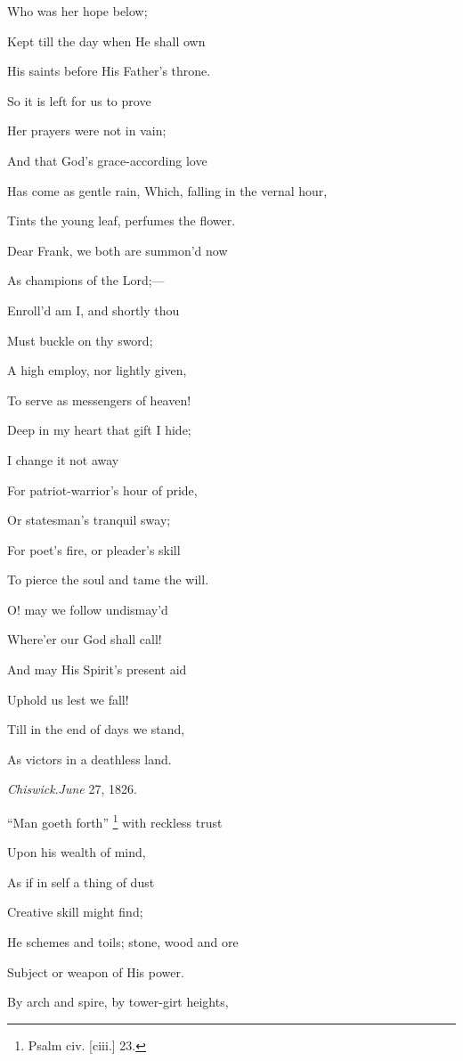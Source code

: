 Who was her hope below;

Kept till the day when He shall own

His saints before His Father's throne.

So it is left for us to prove

Her prayers were not in
vain;

And that God's grace-according love

Has come as gentle rain,
Which, falling in the vernal hour,

Tints the young leaf, perfumes the flower.

Dear Frank, we both are summon'd now

As champions of the Lord;—

Enroll'd am I, and shortly thou

Must buckle on thy sword;

A high employ, nor lightly given,

To serve as messengers of heaven!

Deep in my heart that gift I hide;

I change it not away

For patriot-warrior's hour of pride,

Or statesman's tranquil
sway;

For poet's fire, or pleader's skill

To pierce the soul and tame the will.

O! may we follow undismay'd

Where'er our God shall
call!

And may His Spirit's present aid

Uphold us lest we fall!

Till in the end of days we stand,

As victors in a deathless land.

\emph{Chiswick}.\emph{June} 27, 1826.


``Man goeth forth'' \footnote{Psalm civ. [ciii.] 23.}
with reckless trust

Upon his wealth of mind,

As if in self a thing of dust

Creative skill might find;

He schemes and toils; stone, wood and ore

Subject or weapon of His power.

By arch and spire, by tower-girt heights,

